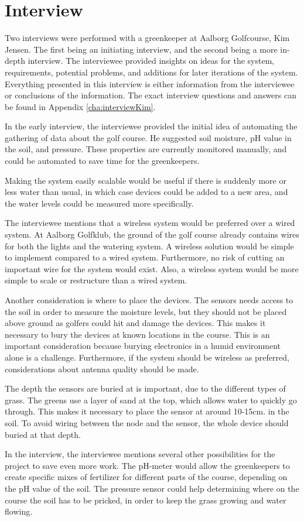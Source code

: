 \section{Interview}
Two interviews were performed with a greenkeeper at Aalborg Golfcourse, Kim Jensen. The first being an initiating interview, and the second being a more in-depth interview. The interviewee provided insights on ideas for the system, requirements, potential problems, and additions for later iterations of the system. Everything presented in this interview is either information from the interviewee or conclusions of the information. The exact interview questions and answers can be found in Appendix \ref{cha:interviewKim}. 

In the early interview, the interviewee provided the initial idea of automating the gathering of data about the golf course. He suggested soil moisture, pH value in the soil, and pressure. These properties are currently monitored manually, and could be automated to save time for the greenkeepers.

Making the system easily scalable would be useful if there is suddenly more or less water than usual, in which case devices could be added to a new area, and the water levels could be measured more specifically.

The interviewee mentions that a wireless system would be preferred over a wired system. At Aalborg Golfklub, the ground of the golf course already contains wires for both the lights and the watering system. A wireless solution would be simple to implement compared to a wired system. Furthermore, no risk of cutting an important wire for the system would exist. Also, a wireless system would be more simple to scale or restructure than a wired system.

Another consideration is where to place the devices. The sensors needs access to the soil in order to measure the moisture levels, but they should not be placed above ground as golfers could hit and damage the devices. This makes it necessary to bury the devices at known locations in the course. This is an important consideration because burying electronics in a humid environment alone is a challenge. Furthermore, if the system should be wireless as preferred, considerations about antenna quality should be made.

The depth the sensors are buried at is important, due to the different types of grass. The greens use a layer of sand at the top, which allows water to quickly go through. This makes it necessary to place the sensor at around 10-15cm. in the soil. To avoid wiring between the node and the sensor, the whole device should buried at that depth.

In the interview, the interviewee mentions several other possibilities for the project to save even more work. The pH-meter would allow the greenkeepers to create specific mixes of fertilizer for different parts of the course, depending on the pH value of the soil. The pressure sensor could help determining where on the course the soil has to be pricked, in order to keep the grass growing and water flowing.
